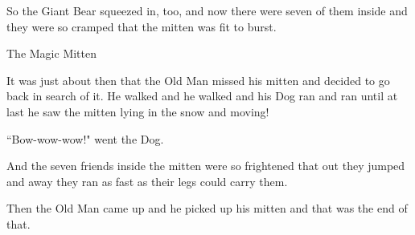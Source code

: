 \documentclass{article}
\begin{document}
So the Giant Bear squeezed in, too, and now there were seven of them inside and they were so cramped that the mitten was fit to burst.

The Magic Mitten

It was just about then that the Old Man missed his mitten and decided to go back in search of it. He walked and he walked and his Dog ran and ran until at last he saw the mitten lying in the snow and moving!

``Bow-wow-wow!" went the Dog.

And the seven friends inside the mitten were so frightened that out they jumped and away they ran as fast as their legs could carry them.

Then the Old Man came up and he picked up his mitten and that was the end of that.
\end{document}
